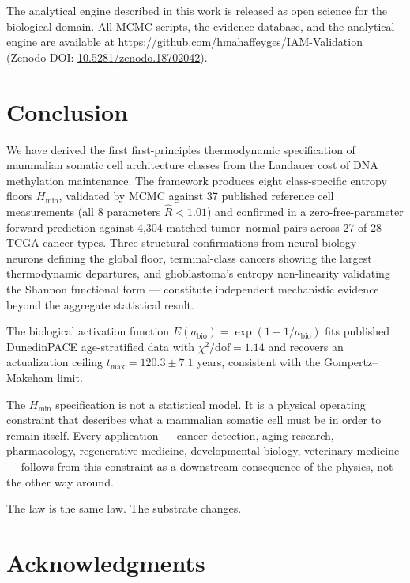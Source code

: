 \documentclass[12pt,a4paper]{article}
\newcommand{\Hmin}{H_{\min}}
\begin{document}
The analytical engine described in this work is released as open science
for the biological domain. All MCMC scripts, the evidence database, and
the analytical engine are available at
\url{https://github.com/hmahaffeyges/IAM-Validation}
(Zenodo DOI: \href{https://doi.org/10.5281/zenodo.18702042}{10.5281/zenodo.18702042}).

\section{Conclusion}
\label{sec:conclusion}

We have derived the first first-principles thermodynamic specification of
mammalian somatic cell architecture classes from the Landauer cost of DNA
methylation maintenance. The framework produces eight class-specific entropy
floors $\Hmin$, validated by MCMC against 37 published reference cell
measurements (all 8 parameters $\hat{R} < 1.01$) and confirmed in a
zero-free-parameter forward prediction against 4,304 matched tumor--normal
pairs across 27 of 28 TCGA cancer types. Three structural confirmations
from neural biology --- neurons defining the global floor, terminal-class
cancers showing the largest thermodynamic departures, and glioblastoma's
entropy non-linearity validating the Shannon functional form --- constitute
independent mechanistic evidence beyond the aggregate statistical result.

The biological activation function $E(a_{\mathrm{bio}}) = \exp(1-1/a_{\mathrm{bio}})$
fits published DunedinPACE age-stratified data with $\chi^2/\mathrm{dof} = 1.14$
and recovers an actualization ceiling $t_{\max} = 120.3 \pm 7.1$ years,
consistent with the Gompertz--Makeham limit.

The $\Hmin$ specification is not a statistical model. It is a physical
operating constraint that describes what a mammalian somatic cell must be
in order to remain itself. Every application --- cancer detection, aging
research, pharmacology, regenerative medicine, developmental biology,
veterinary medicine --- follows from this constraint as a downstream
consequence of the physics, not the other way around.

The law is the same law. The substrate changes.

\section*{Acknowledgments}
\end{document}
